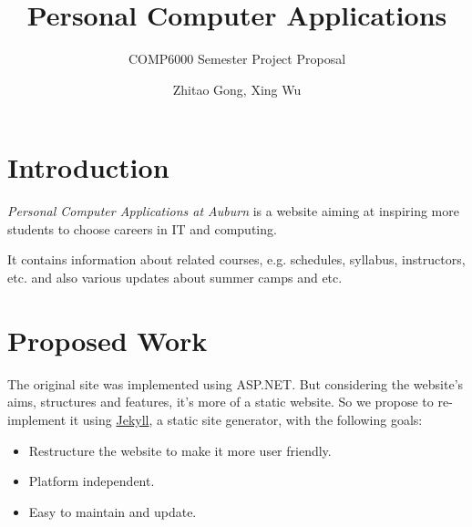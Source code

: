 \documentclass[letterpaper]{scrartcl}
\title{Personal Computer Applications}
\subtitle{COMP6000 Semester Project Proposal}
\author{Zhitao Gong, Xing Wu}
\begin{document}
\maketitle

\section{Introduction}
{\em Personal Computer Applications at Auburn} is a website aiming at
inspiring more students to choose careers in IT and computing.

It contains information about related courses, e.g. schedules,
syllabus, instructors, etc. and also various updates about summer
camps and etc.

\section{Proposed Work}

The original site was implemented using ASP.NET.  But considering the
website's aims, structures and features, it's more of a static
website.  So we propose to re-implement it using
\href{https://github.com/mojombo/jekyll}{Jekyll}, a static site
generator, with the following goals:

\begin{itemize}
\item Restructure the website to make it more user friendly.
\item Platform independent.
\item Easy to maintain and update.
\end{itemize}
\end{document}
